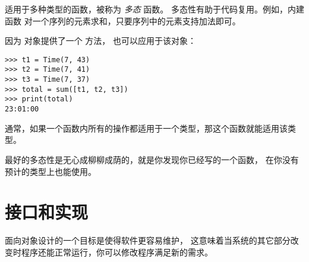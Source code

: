 适用于多种类型的函数，被称为 {\em 多态} 函数。
多态性有助于代码复用。例如，内建函数  对一个序列的元素求和，只要序列中的元素支持加法即可。



因为  对象提供了一个  方法， 也可以应用于该对象：

\begin{lstlisting}
>>> t1 = Time(7, 43)
>>> t2 = Time(7, 41)
>>> t3 = Time(7, 37)
>>> total = sum([t1, t2, t3])
>>> print(total)
23:01:00
\end{lstlisting}

%

通常，如果一个函数内所有的操作都适用于一个类型，那这个函数就能适用该类型。


最好的多态性是无心成柳柳成荫的，就是你发现你已经写的一个函数，
在你没有预计的类型上也能使用。




\section{接口和实现}


面向对象设计的一个目标是使得软件更容易维护，
这意味着当系统的其它部分改变时程序还能正常运行，你可以修改程序满足新的需求。
  
  


